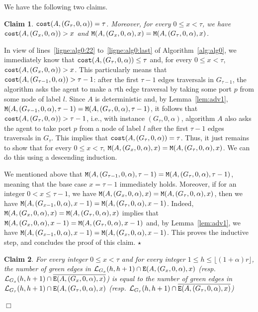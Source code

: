 \documentclass[11pt]{article}
\newtheorem{claim}{Claim}[section]
\newcommand{\qed}{\hfill $\Box$ \bigbreak}
\newenvironment{proof}{\noindent {\bf Proof.}}{\qed}
\newenvironment{proofclaim}{\noindent{\bf Proof of the claim.}}{\hfill$\star$}
\begin{document}
{\begin{proof}
We have the following two claims.

\begin{claim}
\label{theo1:claim0}
${\tt cost}(A,(G_{\tau},0,\alpha))=\tau$. Moreover, for every $0\leq x<\tau$, we have ${\tt cost}(A,(G_x,0,\alpha))>x$ and ${\tt M}(A,(G_x,0,\alpha),x)={\tt M}(A,(G_\tau,0,\alpha),x)$.
\end{claim}

\begin{proofclaim}
In view of lines~\ref{ligne:alg0:22} to~\ref{ligne:alg0:last} of Algorithm~\ref{alg:alg0}, we immediately know that ${\tt cost}(A,(G_{\tau},0,\alpha))\leq \tau$ and, for every $0\leq x <\tau$, ${\tt cost}(A,(G_{x},0,\alpha))>x$. This particularly means that ${\tt cost}(A,(G_{\tau-1},0,\alpha))>\tau-1$: after the first $\tau-1$ edges traversals in $G_{\tau-1}$, the algorithm asks the agent to make a $\tau$th edge traversal by taking some port $p$ from some node of label $l$. Since $A$ is deterministic and, by Lemma~\ref{lem:adv1},  ${\tt M}(A,(G_{\tau-1},0,\alpha),\tau-1)={\tt M}(A,(G_{\tau},0,\alpha),\tau-1)$, it follows that ${\tt cost}(A,(G_{\tau},0,\alpha))> \tau-1$, i.e., with instance $(G_{\tau},0,\alpha)$, algorithm $A$ also asks the agent to take port $p$ from a node of label $l$ after the first $\tau-1$ edges traversals in $G_{\tau}$. This implies that ${\tt cost}(A,(G_{\tau},0,\alpha))= \tau$. Thus, it just remains to show that for every $0\leq x<\tau$, ${\tt M}(A,(G_{x},0,\alpha),x)={\tt M}(A,(G_{\tau},0,\alpha),x)$. We can do this using a descending induction.

We mentioned above that ${\tt M}(A,(G_{\tau-1},0,\alpha),\tau-1)={\tt M}(A,(G_{\tau},0,\alpha),\tau-1)$, meaning that the base case $x=\tau-1$ immediately holds. Moreover, if for an integer $0<x\leq\tau-1$, we have ${\tt M}(A,(G_{x},0,\alpha),x)={\tt M}(A,(G_{\tau},0,\alpha),x)$, then we have  ${\tt M}(A,(G_{x-1},0,\alpha),x-1)={\tt M}(A,(G_{\tau},0,\alpha),x-1)$. Indeed, ${\tt M}(A,(G_{x},0,\alpha),x)={\tt M}(A,(G_{\tau},0,\alpha),x)$ implies that ${\tt M}(A,(G_{x},0,\alpha),x-1)={\tt M}(A,(G_{\tau},0,\alpha),x-1)$ and, by Lemma~\ref{lem:adv1}, we have ${\tt M}(A,(G_{x-1},0,\alpha),x-1)={\tt M}(A,(G_{x},0,\alpha),x-1)$. This proves the inductive step, and concludes the proof of this claim.
\end{proofclaim}

\begin{claim}
\label{theo1:claim0bis}
For every integer $0\leq x<\tau$ and for every integer $1\leq h \leq  \lfloor(1+\alpha)r\rfloor$, the number of green edges in $\mathcal{L}_{G_{x}}(h,h+1)\cap{\tt E}(A,(G_{x},0,\alpha),x)$ (resp. $\mathcal{L}_{G_{x}}(h,h+1)\cap\overline{{\tt E}(A,(G_{x},0,\alpha),x)}$) is equal to the number of green edges in $\mathcal{L}_{G_{\tau}}(h,h+1)\cap{\tt E}(A,(G_{\tau},0,\alpha),x)$ (resp. $\mathcal{L}_{G_{\tau}}(h,h+1)\cap\overline{{\tt E}(A,(G_{\tau},0,\alpha),x)}$)
\end{claim}


\end{proof}}
\end{document}

